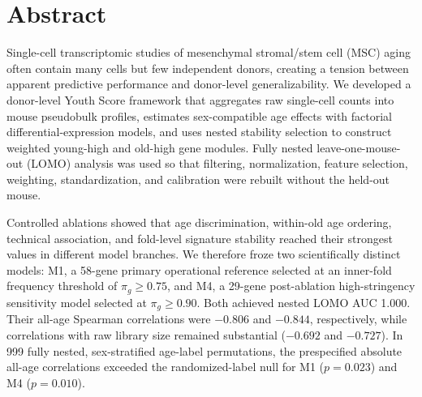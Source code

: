\documentclass[10pt,twocolumn]{article}
\begin{document}
\raggedbottom


\section*{Abstract}

Single-cell transcriptomic studies of mesenchymal stromal/stem cell (MSC) aging often contain many cells but few independent donors, creating a tension between apparent predictive performance and donor-level generalizability. We developed a donor-level Youth Score framework that aggregates raw single-cell counts into mouse pseudobulk profiles, estimates sex-compatible age effects with factorial differential-expression models, and uses nested stability selection to construct weighted young-high and old-high gene modules. Fully nested leave-one-mouse-out (LOMO) analysis was used so that filtering, normalization, feature selection, weighting, standardization, and calibration were rebuilt without the held-out mouse.

Controlled ablations showed that age discrimination, within-old age ordering, technical association, and fold-level signature stability reached their strongest values in different model branches. We therefore froze two scientifically distinct models: M1, a 58-gene primary operational reference selected at an inner-fold frequency threshold of \(\pi_g\geq0.75\), and M4, a 29-gene post-ablation high-stringency sensitivity model selected at \(\pi_g\geq0.90\). Both achieved nested LOMO AUC 1.000. Their all-age Spearman correlations were \(-0.806\) and \(-0.844\), respectively, while correlations with raw library size remained substantial (\(-0.692\) and \(-0.727\)). In 999 fully nested, sex-stratified age-label permutations, the prespecified absolute all-age correlations exceeded the randomized-label null for M1 (\(p=0.023\)) and M4 (\(p=0.010\)).
\end{document}
